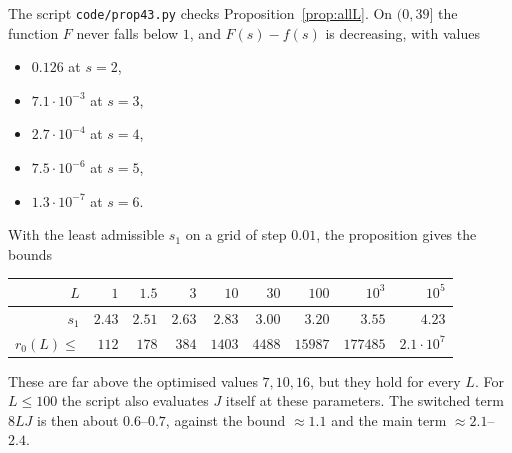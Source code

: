 \documentclass[11pt]{amsart}
\theoremstyle{remark}
\begin{document}
The script \texttt{code/prop43.py} checks Proposition~\ref{prop:allL}. On $(0,39]$ the function $F$ never falls below $1$, and $F(s)-f(s)$ is decreasing, with values
\begin{itemize}[leftmargin=1.5em]
\item $0.126$ at $s=2$,
\item $7.1\cdot10^{-3}$ at $s=3$,
\item $2.7\cdot10^{-4}$ at $s=4$,
\item $7.5\cdot10^{-6}$ at $s=5$,
\item $1.3\cdot10^{-7}$ at $s=6$.
\end{itemize}
With the least admissible $s_1$ on a grid of step $0.01$, the proposition gives the bounds
\begin{center}
\begin{tabular}{rrrrrrrrr}
\toprule
$L$ & $1$ & $1.5$ & $3$ & $10$ & $30$ & $100$ & $10^3$ & $10^5$\\
\midrule
$s_1$ & $2.43$ & $2.51$ & $2.63$ & $2.83$ & $3.00$ & $3.20$ & $3.55$ & $4.23$\\
$r_0(L)\le$ & $112$ & $178$ & $384$ & $1403$ & $4488$ & $15987$ & $177485$ & $2.1\cdot10^7$\\
\bottomrule
\end{tabular}
\end{center}
These are far above the optimised values $7,10,16$, but they hold for every $L$. For $L\le100$ the script also evaluates $J$ itself at these parameters. The switched term $8LJ$ is then about $0.6$--$0.7$, against the bound $\approx1.1$ and the main term $\approx2.1$--$2.4$.
\end{document}
